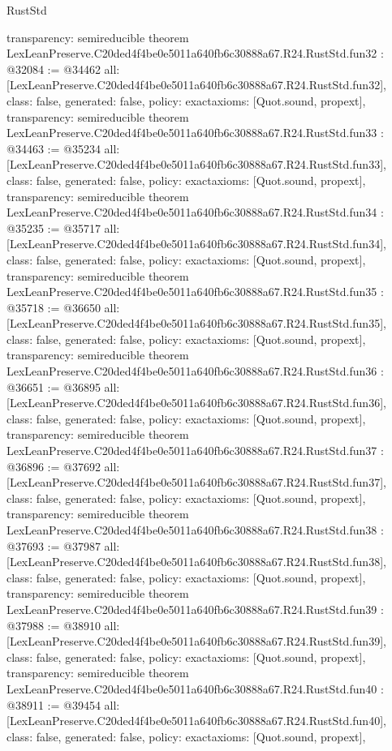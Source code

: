 \begin{lexlean}{RustStd}
\begin{coremodule}
{  transparency: semireducible
}
theorem LexLeanPreserve.C20ded4f4be0e5011a640fb6c30888a67.R24.RustStd.fun32 : @32084 := @34462 {
  all: [LexLeanPreserve.C20ded4f4be0e5011a640fb6c30888a67.R24.RustStd.fun32],
  class: false,
  generated: false,
  policy: exact{axioms: [Quot.sound, propext]},
  transparency: semireducible
}
theorem LexLeanPreserve.C20ded4f4be0e5011a640fb6c30888a67.R24.RustStd.fun33 : @34463 := @35234 {
  all: [LexLeanPreserve.C20ded4f4be0e5011a640fb6c30888a67.R24.RustStd.fun33],
  class: false,
  generated: false,
  policy: exact{axioms: [Quot.sound, propext]},
  transparency: semireducible
}
theorem LexLeanPreserve.C20ded4f4be0e5011a640fb6c30888a67.R24.RustStd.fun34 : @35235 := @35717 {
  all: [LexLeanPreserve.C20ded4f4be0e5011a640fb6c30888a67.R24.RustStd.fun34],
  class: false,
  generated: false,
  policy: exact{axioms: [Quot.sound, propext]},
  transparency: semireducible
}
theorem LexLeanPreserve.C20ded4f4be0e5011a640fb6c30888a67.R24.RustStd.fun35 : @35718 := @36650 {
  all: [LexLeanPreserve.C20ded4f4be0e5011a640fb6c30888a67.R24.RustStd.fun35],
  class: false,
  generated: false,
  policy: exact{axioms: [Quot.sound, propext]},
  transparency: semireducible
}
theorem LexLeanPreserve.C20ded4f4be0e5011a640fb6c30888a67.R24.RustStd.fun36 : @36651 := @36895 {
  all: [LexLeanPreserve.C20ded4f4be0e5011a640fb6c30888a67.R24.RustStd.fun36],
  class: false,
  generated: false,
  policy: exact{axioms: [Quot.sound, propext]},
  transparency: semireducible
}
theorem LexLeanPreserve.C20ded4f4be0e5011a640fb6c30888a67.R24.RustStd.fun37 : @36896 := @37692 {
  all: [LexLeanPreserve.C20ded4f4be0e5011a640fb6c30888a67.R24.RustStd.fun37],
  class: false,
  generated: false,
  policy: exact{axioms: [Quot.sound, propext]},
  transparency: semireducible
}
theorem LexLeanPreserve.C20ded4f4be0e5011a640fb6c30888a67.R24.RustStd.fun38 : @37693 := @37987 {
  all: [LexLeanPreserve.C20ded4f4be0e5011a640fb6c30888a67.R24.RustStd.fun38],
  class: false,
  generated: false,
  policy: exact{axioms: [Quot.sound, propext]},
  transparency: semireducible
}
theorem LexLeanPreserve.C20ded4f4be0e5011a640fb6c30888a67.R24.RustStd.fun39 : @37988 := @38910 {
  all: [LexLeanPreserve.C20ded4f4be0e5011a640fb6c30888a67.R24.RustStd.fun39],
  class: false,
  generated: false,
  policy: exact{axioms: [Quot.sound, propext]},
  transparency: semireducible
}
theorem LexLeanPreserve.C20ded4f4be0e5011a640fb6c30888a67.R24.RustStd.fun40 : @38911 := @39454 {
  all: [LexLeanPreserve.C20ded4f4be0e5011a640fb6c30888a67.R24.RustStd.fun40],
  class: false,
  generated: false,
  policy: exact{axioms: [Quot.sound, propext]},
}
\end{coremodule}
\end{lexlean}
